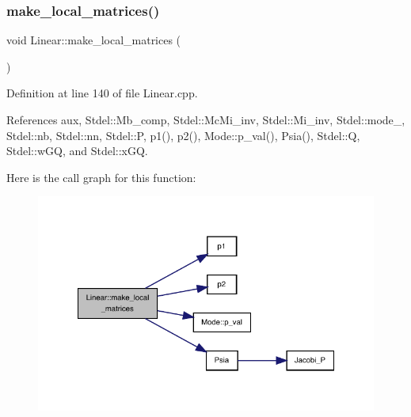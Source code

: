 \mbox{\label{classLinear_a6d8c4a22ea8c6f2a55baabd682905c92}} 
\subsubsection{\texorpdfstring{make\+\_\+local\+\_\+matrices()}{make\_local\_matrices()}}
{\footnotesize\ttfamily void Linear\+::make\+\_\+local\+\_\+matrices (\begin{DoxyParamCaption}{ }\end{DoxyParamCaption})}



Definition at line 140 of file Linear.\+cpp.



References aux, Stdel\+::\+Mb\+\_\+comp, Stdel\+::\+Mc\+Mi\+\_\+inv, Stdel\+::\+Mi\+\_\+inv, Stdel\+::mode\+\_\+, Stdel\+::nb, Stdel\+::nn, Stdel\+::P, p1(), p2(), Mode\+::p\+\_\+val(), Psia(), Stdel\+::Q, Stdel\+::w\+GQ, and Stdel\+::x\+GQ.

Here is the call graph for this function\+:
\nopagebreak
\begin{figure}[H]
\begin{center}
\leavevmode
\includegraphics[width=335pt]{classLinear_a6d8c4a22ea8c6f2a55baabd682905c92_cgraph}
\end{center}
\end{figure}
\mbox{\label{classLinear_a8dbda741546df5950a53898a05d6dc33}} 
